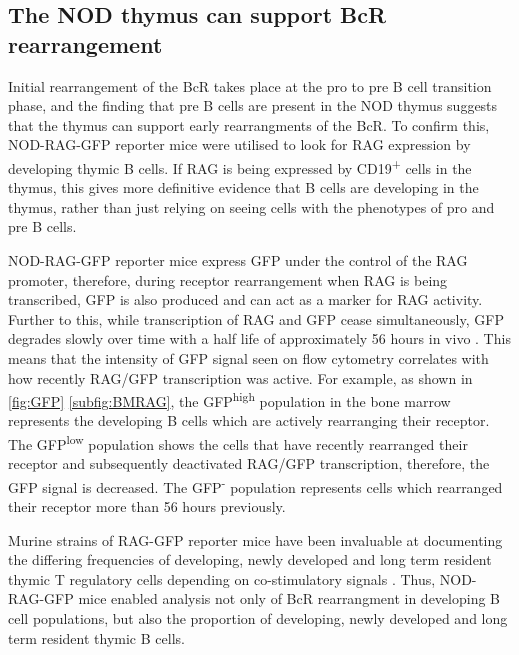 



\subsection{The NOD thymus can support BcR rearrangement}

Initial rearrangement of the BcR takes place at the pro to pre B cell transition phase, and the finding that pre B cells are present in the NOD thymus suggests that the thymus can support early rearrangments of the BcR.
To confirm this, NOD-RAG-GFP reporter mice were utilised to look for RAG expression by developing thymic B cells.
If RAG is being expressed by CD19\textsuperscript{+} cells in the thymus, this gives more definitive evidence that B cells are developing in the thymus, rather than just relying on seeing cells with the phenotypes of pro and pre B cells.

NOD-RAG-GFP reporter mice express GFP under the control of the RAG promoter, therefore, during receptor rearrangement when RAG is being transcribed, GFP is also produced and can act as a marker for RAG activity.
Further to this, while transcription of RAG and GFP cease simultaneously, GFP degrades slowly over time with a half life of approximately 56 hours in vivo \citep{McCaughtry2007}.
This means that the intensity of GFP signal seen on flow cytometry correlates with how recently RAG/GFP transcription was active.
For example, as shown in \cref{fig:GFP} \ref{subfig:BMRAG}, the GFP\textsuperscript{high} population in the bone marrow represents the developing B cells which are actively rearranging their receptor.
The GFP\textsuperscript{low} population shows the cells that have recently rearranged their receptor and subsequently deactivated RAG/GFP transcription, therefore, the GFP signal is decreased.
The GFP\textsuperscript{-} population represents cells which rearranged their receptor more than 56 hours previously.

Murine strains of RAG-GFP reporter mice have been invaluable at documenting the differing frequencies of developing, newly developed and long term resident thymic T regulatory cells depending on co-stimulatory signals \citep{Cuss2012}.
Thus, NOD-RAG-GFP mice enabled analysis not only of BcR rearrangment in developing B cell populations, but also the proportion of developing, newly developed and long term resident thymic B cells.

